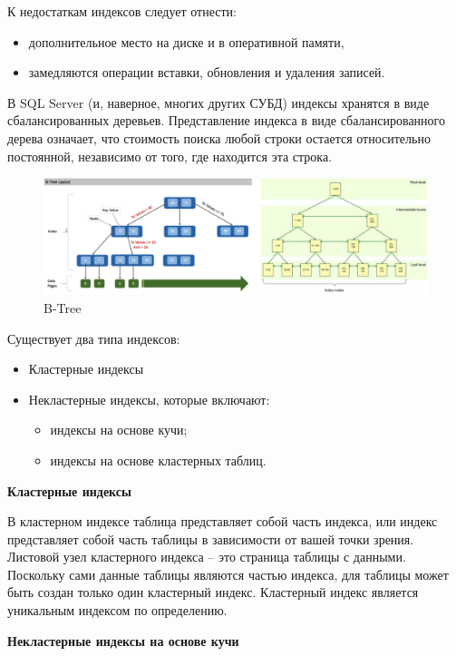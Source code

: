 К недостаткам индексов следует отнести:
\begin{itemize}
	\item дополнительное место на диске и в оперативной памяти, 
	\item замедляются операции вставки, обновления и удаления записей. 
\end{itemize}

В SQL Server (и, наверное, многих других СУБД) индексы хранятся в виде сбалансированных деревьев. Представление индекса в виде сбалансированного дерева означает, что стоимость поиска любой строки остается относительно постоянной, независимо от того, где находится эта строка. 

\begin{figure}[ht!]
	\centering
 	\includegraphics[width=18cm, keepaspectratio]{assets/index.png}
	\caption{B-Tree} 
\end{figure}
\FloatBarrier
Существует два типа индексов: 

\begin{itemize}
	\item Кластерные индексы
	\item Некластерные индексы, которые включают: 
	\begin{itemize}[label=--]
		\item индексы на основе кучи;
		\item индексы на основе кластерных таблиц.
	\end{itemize}
\end{itemize}

\textbf{Кластерные индексы}

В кластерном индексе таблица представляет собой часть индекса, или индекс представляет собой часть таблицы в зависимости от вашей точки зрения. Листовой узел кластерного индекса – это страница таблицы с данными. Поскольку сами данные таблицы являются частью индекса, для таблицы может быть создан только один кластерный индекс. Кластерный индекс является уникальным индексом по определению.

\textbf{Некластерные индексы на основе кучи}

